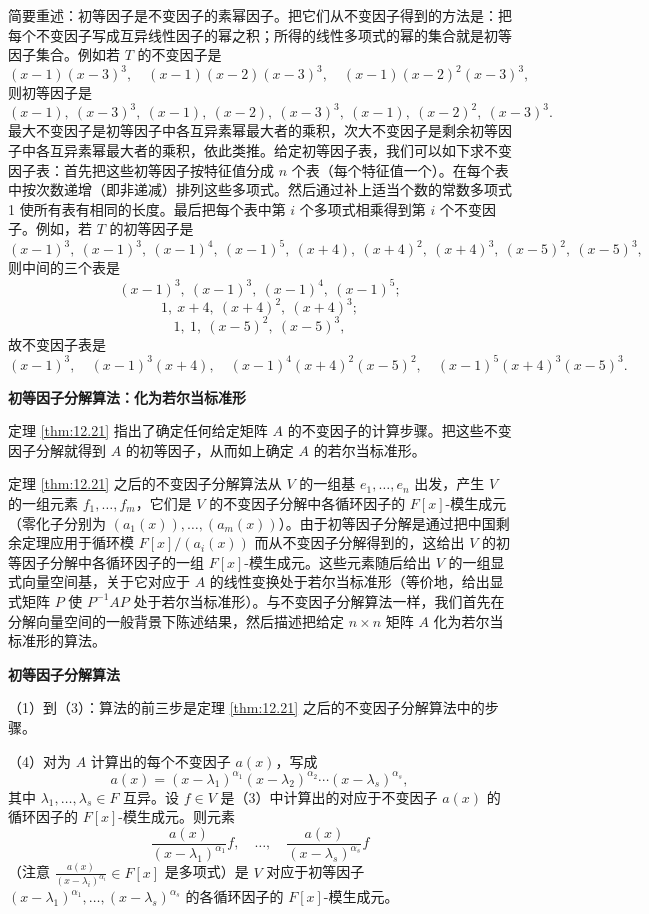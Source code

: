 简要重述：初等因子是不变因子的素幂因子。把它们从不变因子得到的方法是：把每个不变因子写成互异线性因子的幂之积；所得的线性多项式的幂的集合就是初等因子集合。例如若 \(T\) 的不变因子是
\[
(x-1)(x-3)^3, \quad (x-1)(x-2)(x-3)^3, \quad (x-1)(x-2)^2(x-3)^3,
\]
则初等因子是
\[
(x-1),\ (x-3)^3,\ (x-1),\ (x-2),\ (x-3)^3,\ (x-1),\ (x-2)^2,\ (x-3)^3.
\]
最大不变因子是初等因子中各互异素幂最大者的乘积，次大不变因子是剩余初等因子中各互异素幂最大者的乘积，依此类推。给定初等因子表，我们可以如下求不变因子表：首先把这些初等因子按特征值分成 \(n\) 个表（每个特征值一个）。在每个表中按次数递增（即非递减）排列这些多项式。然后通过补上适当个数的常数多项式 1 使所有表有相同的长度。最后把每个表中第 \(i\) 个多项式相乘得到第 \(i\) 个不变因子。例如，若 \(T\) 的初等因子是
\[
(x-1)^3,\ (x-1)^3,\ (x-1)^4,\ (x-1)^5,\ (x+4),\ (x+4)^2,\ (x+4)^3,\ (x-5)^2,\ (x-5)^3,
\]
则中间的三个表是
\[
(x-1)^3,\ (x-1)^3,\ (x-1)^4,\ (x-1)^5;
\]
\[
1,\ x+4,\ (x+4)^2,\ (x+4)^3;
\]
\[
1,\ 1,\ (x-5)^2,\ (x-5)^3,
\]
故不变因子表是
\[
(x-1)^3,\quad (x-1)^3(x+4),\quad (x-1)^4(x+4)^2(x-5)^2,\quad (x-1)^5(x+4)^3(x-5)^3.
\]

\noindent\textbf{初等因子分解算法：化为若尔当标准形}

定理 \ref{thm:12.21} 指出了确定任何给定矩阵 \(A\) 的不变因子的计算步骤。把这些不变因子分解就得到 \(A\) 的初等因子，从而如上确定 \(A\) 的若尔当标准形。

定理 \ref{thm:12.21} 之后的不变因子分解算法从 \(V\) 的一组基 \(e_1, \ldots, e_n\) 出发，产生 \(V\) 的一组元素 \(f_1, \ldots, f_m\)，它们是 \(V\) 的不变因子分解中各循环因子的 \(F[x]\)-模生成元（零化子分别为 \((a_1(x)), \ldots, (a_m(x))\)）。由于初等因子分解是通过把中国剩余定理应用于循环模 \(F[x]/(a_i(x))\) 而从不变因子分解得到的，这给出 \(V\) 的初等因子分解中各循环因子的一组 \(F[x]\)-模生成元。这些元素随后给出 \(V\) 的一组显式向量空间基，关于它对应于 \(A\) 的线性变换处于若尔当标准形（等价地，给出显式矩阵 \(P\) 使 \(P^{-1}AP\) 处于若尔当标准形）。与不变因子分解算法一样，我们首先在分解向量空间的一般背景下陈述结果，然后描述把给定 \(n \times n\) 矩阵 \(A\) 化为若尔当标准形的算法。

\noindent\textbf{初等因子分解算法}

（1）到（3）：算法的前三步是定理 \ref{thm:12.21} 之后的不变因子分解算法中的步骤。

（4）对为 \(A\) 计算出的每个不变因子 \(a(x)\)，写成
\[
a(x) = (x-\lambda_1)^{\alpha_1}(x-\lambda_2)^{\alpha_2}\cdots(x-\lambda_s)^{\alpha_s},
\]
其中 \(\lambda_1, \ldots, \lambda_s \in F\) 互异。设 \(f \in V\) 是（3）中计算出的对应于不变因子 \(a(x)\) 的循环因子的 \(F[x]\)-模生成元。则元素
\[
\frac{a(x)}{(x-\lambda_1)^{\alpha_1}}f,\quad \ldots,\quad \frac{a(x)}{(x-\lambda_s)^{\alpha_s}}f
\]
（注意 \(\frac{a(x)}{(x-\lambda_i)^{\alpha_i}} \in F[x]\) 是多项式）是 \(V\) 对应于初等因子 \((x-\lambda_1)^{\alpha_1}, \ldots, (x-\lambda_s)^{\alpha_s}\) 的各循环因子的 \(F[x]\)-模生成元。

